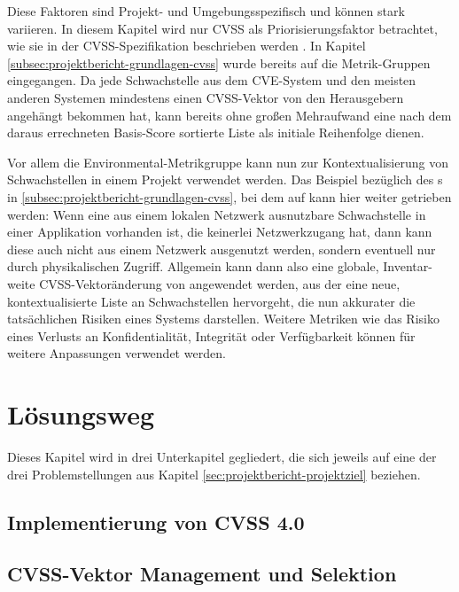 Diese Faktoren sind Projekt- und Umgebungsspezifisch und können stark variieren.
In diesem Kapitel wird nur CVSS als Priorisierungsfaktor betrachtet, wie sie in der CVSS-Spezifikation beschrieben werden .
In Kapitel \ref{subsec:projektbericht-grundlagen-cvss} wurde bereits auf die Metrik-Gruppen eingegangen.
Da jede Schwachstelle aus dem CVE-System und den meisten anderen Systemen mindestens einen CVSS-Vektor von den Herausgebern angehängt bekommen hat, kann bereits ohne großen Mehraufwand eine nach dem daraus errechneten Basis-Score sortierte Liste als initiale Reihenfolge dienen.

Vor allem die Environmental-Metrikgruppe kann nun zur Kontextualisierung von Schwachstellen in einem Projekt verwendet werden.
Das Beispiel bezüglich des s in \ref{subsec:projektbericht-grundlagen-cvss}, bei dem  auf  kann hier weiter getrieben werden:
Wenn eine aus einem lokalen Netzwerk ausnutzbare Schwachstelle in einer Applikation vorhanden ist, die keinerlei Netzwerkzugang hat, dann kann diese auch nicht aus einem Netzwerk ausgenutzt werden, sondern eventuell nur durch physikalischen Zugriff.
Allgemein kann dann also eine globale, Inventar-weite CVSS-Vektoränderung von  angewendet werden, aus der eine neue, kontextualisierte Liste an Schwachstellen hervorgeht, die nun akkurater die tatsächlichen Risiken eines Systems darstellen.
Weitere Metriken wie das Risiko eines Verlusts an Konfidentialität, Integrität oder Verfügbarkeit können für weitere Anpassungen verwendet werden.




\section{Lösungsweg} \label{sec:projektbericht-loesungsweg}

Dieses Kapitel wird in drei Unterkapitel gegliedert, die sich jeweils auf eine der drei Problemstellungen aus Kapitel \ref{sec:projektbericht-projektziel} beziehen.

\subsection{Implementierung von CVSS 4.0} \label{subsec:projektbericht-loesungsweg-cvss-4-implementierung}

\subsection{CVSS-Vektor Management und Selektion} \label{subsec:projektbericht-loesungsweg-cvss-management-selektor}

